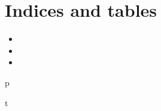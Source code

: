 \documentclass[letterpaper,10pt,spanish]{sphinxmanual}
\begin{document}
\chapter{Indices and tables}
\label{\detokenize{index:indices-and-tables}}\label{\detokenize{index:welcome-to-polimorfismo-s-documentation}}\begin{itemize}
\item {} 

\item {} 

\item {} 

\end{itemize}


\renewcommand{\indexname}{Índice de Módulos Python}
\begin{sphinxtheindex}
\def\bigletter#1{{\Large\sffamily#1}\nopagebreak\vspace{1mm}}
\bigletter{p}
\item {}
\indexspace
\bigletter{t}
\item {}
\end{sphinxtheindex}

\renewcommand{\indexname}{Índice}
\printindex
\end{document}
